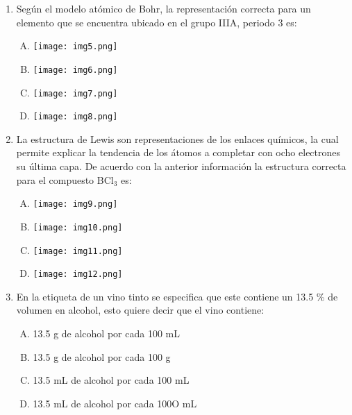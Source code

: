 \begin{enumerate}

\newpage
\item  Según el modelo atómico de Bohr, la representación correcta para un elemento que se encuentra ubicado en el grupo IIIA, periodo 3 es:\label{jenn-4}


\begin{enumerate}[(A)]
\item \texttt{[image: img5.png]}
\item \texttt{[image: img6.png]}
\item \texttt{[image: img7.png]}\\
\item \texttt{[image: img8.png]}
\end{enumerate}



\newpage
\item   La estructura de Lewis son representaciones de los enlaces químicos, la cual permite explicar la tendencia de los átomos a completar con ocho electrones su última capa. De acuerdo con la anterior información la estructura correcta para el compuesto BCl$_3$ es:\label{jenn-5}


\begin{enumerate}[(A)]
\item \texttt{[image: img9.png]}
\item \texttt{[image: img10.png]}
\item \texttt{[image: img11.png]}\\
\item \texttt{[image: img12.png]}
\end{enumerate}




\item En la etiqueta de un vino tinto se especifica que este contiene un 13.5 \% de volumen en alcohol, esto quiere decir que el vino contiene:\label{jenn-6}


\begin{enumerate}[(A)]
\item 13.5 g de alcohol por cada 100 mL 
\item  13.5 g de alcohol por cada 100 g
\item  13.5 mL de alcohol por cada 100 mL
\item  13.5 mL de alcohol por cada 100O mL
\end{enumerate}



\end{enumerate}
